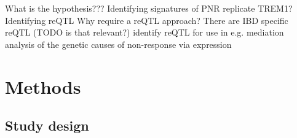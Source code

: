 \begin{outline}
\1 What is the hypothesis???
\1 Identifying signatures of PNR
    \2 replicate TREM1?
\1 Identifying reQTL
    \2 Why require a reQTL approach?
    \2 There are IBD specific reQTL (TODO is that relevant?) \autocite{piasecka2018DistinctiveRolesAge}
    \2 identify reQTL for use in e.g. mediation analysis of the genetic causes of non-response via expression

\section{Methods}

\subsection{Study design}

%

\end{outline}
